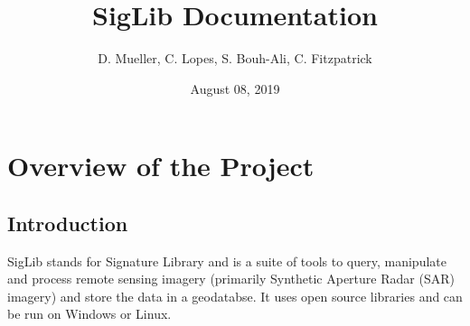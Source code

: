 \documentclass[letterpaper,10pt,openany,oneside]{sphinxmanual}
\title{SigLib Documentation}
\date{August 08, 2019}
\author{D. Mueller, C. Lopes, S. Bouh-Ali, C. Fitzpatrick}
\begin{document}
\maketitle
\tableofcontents
{}\label{index::doc}



\chapter{Overview of the Project}
\label{intro:overview-of-the-project}\label{intro:welcome-to-siglib-s-documentation}\label{intro::doc}

\section{Introduction}
\label{intro:introduction}
SigLib stands for Signature Library and is a suite of tools to query,
manipulate and process remote sensing imagery (primarily Synthetic
Aperture Radar (SAR) imagery) and store the data in a geodatabse. It
uses open source libraries and can be run on Windows or Linux.
\end{document}
